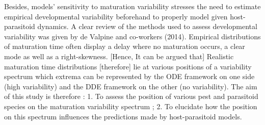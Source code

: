 \documentclass[12pt,a4paper,onecolumn]{article}
\begin{document}
\tabto{1 cm} Besides, models' sensitivity to maturation variability stresses the need to estimate empirical developmental variability beforehand to properly model given host-parasitoid dynamics. A clear review of the methods used to assess developmental variability was given by de Valpine and co-workers (2014). Empirical distributions of maturation time often display a delay where no maturation occurs, a clear mode as well as a right-skewness. 
\tabto{1 cm} 
[Hence, It can be argued that] Realistic maturation time distributions [therefore] lie at various positions of a variability spectrum which extrema can be represented by the ODE framework on one side (high variability) and the DDE framework on the other (no variability).  The aim of this study is therefore : 1. To assess the position of various pest and parasitoid species on the maturation variability spectrum ; 2. To elucidate how the position on this spectrum influences the predictions made by host-parasitoid models. 
\end{document}
